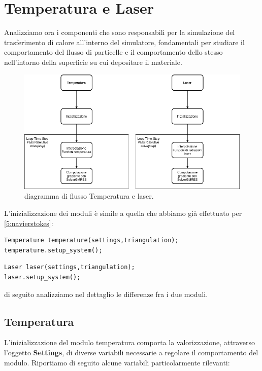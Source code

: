     \section{Temperatura e Laser}\label{5:temperaturelaser}
    Analizziamo ora i componenti che sono responsabili per la simulazione del trasferimento di calore all'interno del simulatore, fondamentali per studiare il comportamento del flusso di
    particelle e il comportamento dello stesso nell'intorno della superficie su cui depositare il materiale.
    \begin{figure}[H]
        \centering
        \includegraphics[width=\linewidth]{diagrammi/diagrammiTemp.png}
        \caption{diagramma di flusso Temperatura e laser.}
    \end{figure}
    L'inizializzazione dei moduli è simile a quella che abbiamo già effettuato per \ref{5:navierstokes}:
    \begin{verbatim}
Temperature temperature(settings,triangulation);
temperature.setup_system();
    \end{verbatim}

    \begin{verbatim}
Laser laser(settings,triangulation);
laser.setup_system();
    \end{verbatim}
    di seguito analizziamo nel dettaglio le differenze fra i due moduli.

    \subsection{Temperatura}\label{5:temperatura}
    L'inizializzazione del modulo temperatura comporta la valorizzazione, attraverso l'oggetto \textbf{Settings}, di diverse variabili necessarie a regolare il comportamento del modulo.
    Riportiamo di seguito alcune variabili particolarmente rilevanti:

